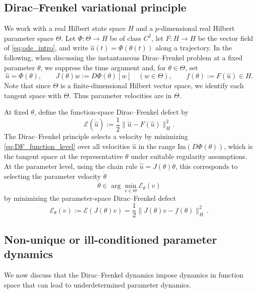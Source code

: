 \documentclass[oneside,11pt]{article}
\theoremstyle{remark}
\theoremstyle{thmstyleone}
\theoremstyle{thmstylethree}
\theoremstyle{thmstyletwo}
\newcommand{\norm}[1]{\lVert #1\rVert}
\begin{document}
\subsection{Dirac--Frenkel variational principle}
We work with a real Hilbert state space $H$ and a $p$-dimensional real Hilbert parameter space $\Theta$.
Let $\Phi:\Theta\to H$ be of class $C^2$, let $F:H\to H$ be the vector field of \eqref{eq:ode_intro}, and write $\hat u(t)=\Phi(\theta(t))$ along a trajectory.
In the following, when discussing the instantaneous Dirac--Frenkel problem at a fixed parameter $\theta$, we suppress the time argument and, for $\theta\in \Theta$, set
        \begin{equation}
          \hat u=\Phi(\theta),
          \qquad J(\theta)w:=D\Phi(\theta)[w]\quad(w\in \Theta),
          \qquad f(\theta):=F(\hat u)\in H.
          \label{eq:Jf_def}
        \end{equation}
Note that since $\Theta$ is a finite-dimensional Hilbert vector space, we identify each tangent space
with $\Theta$. Thus parameter velocities  are in  $\Theta$.

At fixed $\theta$, define the function-space Dirac--Frenkel defect by
        \begin{equation}
          \mathcal{E}(\dot{\hat u})
          :=\frac12\norm{\dot{\hat u} - F(\hat u)}_H^2.
          \label{eq:DF_function_level}
        \end{equation}
        The Dirac--Frenkel principle selects a velocity by minimizing \eqref{eq:DF_function_level} over all velocities $\dot{\hat u}$ in the range $\mathrm{Im} (D\Phi(\theta))$, which is the tangent space at the representative $\theta$ under suitable regularity assumptions. 
At the parameter level, using the chain rule $\dot{\hat u}=J(\theta)\dot \theta$, this corresponds to selecting the parameter velocity $\dot \theta$ 
        \begin{equation}
          \dot \theta \in \arg\min_{v\in \Theta} \mathcal{E}_\theta(v)
          \label{eq:DF_parameter_level}
        \end{equation}
        by minimizing the parameter-space Dirac--Frenkel defect
        \begin{equation}\label{eq:DFDefect}
        \mathcal{E}_\theta(v)
    :=\mathcal{E}(J(\theta)v)
          =\frac12\norm{J(\theta)v-f(\theta)}_H^2\,.
        \end{equation}
      

\subsection{Non-unique or ill-conditioned parameter dynamics}\label{sec:ProblemFormulation}
We now discuss that the Dirac--Frenkel dynamics impose dynamics in function space that can lead to underdetermined parameter dynamics. 
\end{document}
